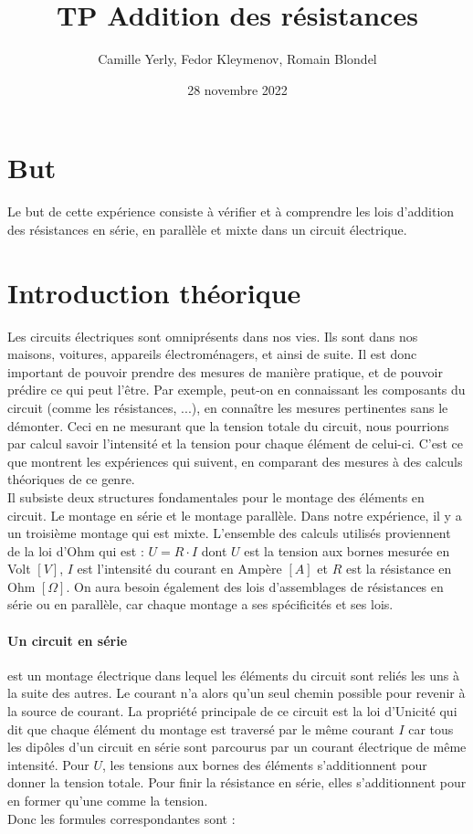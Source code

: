 \documentclass[11pt]{article}
\title{\textbf{TP Addition des résistances}}
\author{Camille Yerly, Fedor Kleymenov, Romain Blondel}
\affil{2M8, Gymnase Auguste Piccard}
\date{28 novembre 2022}
\begin{document}
\maketitle

\section{But}

Le but de cette expérience consiste à vérifier et à comprendre les lois d’addition des résistances en série, en parallèle et mixte dans un circuit électrique.  

\section{Introduction théorique}

Les circuits électriques sont omniprésents dans nos vies. Ils sont dans nos maisons, voitures, appareils électroménagers, et ainsi de suite. Il est donc important de pouvoir prendre des mesures de manière pratique, et de pouvoir prédire ce qui peut l'être. Par exemple, peut-on en connaissant les composants du circuit (comme les résistances, ...), en connaître les mesures pertinentes sans le démonter. Ceci en ne mesurant que la tension totale du circuit, nous pourrions par calcul savoir l'intensité et la tension pour chaque élément de celui-ci. C'est ce que montrent les expériences qui suivent, en comparant des mesures à des calculs théoriques de ce genre.\\

Il subsiste deux structures fondamentales pour le montage des éléments en circuit. Le montage en série et le montage parallèle. Dans notre expérience, il y a un troisième montage qui est mixte. L’ensemble des calculs utilisés proviennent de la loi d’Ohm qui est : $U=R \cdot I$ dont $U$ est la tension aux bornes mesurée en Volt $[V]$, $I$ est l’intensité du courant en Ampère $[A]$ et $R$ est la résistance en Ohm $[\Omega]$. On aura besoin également des lois d’assemblages de résistances en série ou en parallèle, car chaque montage a ses spécificités et ses lois.

\paragraph*{Un circuit en série} est un montage électrique dans lequel les éléments du circuit sont reliés les uns à la suite des autres. Le courant n’a alors qu’un seul chemin possible pour revenir à la source de courant. La propriété principale de ce circuit est la loi d’Unicité qui dit que chaque élément du montage est traversé par le même courant $I$  car tous les dipôles d’un circuit en série sont parcourus par un courant électrique de même intensité. Pour $U$, les tensions aux bornes des éléments s’additionnent pour donner la tension totale. Pour finir la résistance en série, elles s’additionnent pour en former qu’une comme la tension.\\
Donc les formules correspondantes sont :  
\end{document}
